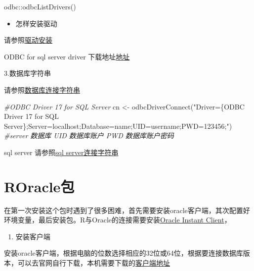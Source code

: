 \documentclass[
]{book}
\newenvironment{Shaded}{\begin{snugshade}}{\end{snugshade}}
\newcommand{\CommentTok}[1]{\textcolor[rgb]{0.56,0.35,0.01}{\textit{#1}}}
\newcommand{\FunctionTok}[1]{\textcolor[rgb]{0.00,0.00,0.00}{#1}}
\newcommand{\NormalTok}[1]{#1}
\newcommand{\OtherTok}[1]{\textcolor[rgb]{0.56,0.35,0.01}{#1}}
\newcommand{\SpecialCharTok}[1]{\textcolor[rgb]{0.00,0.00,0.00}{#1}}
\newcommand{\StringTok}[1]{\textcolor[rgb]{0.31,0.60,0.02}{#1}}
\providecommand{\tightlist}{%
  \setlength{\itemsep}{0pt}\setlength{\parskip}{0pt}}
\begin{document}
\begin{Shaded}
\begin{Highlighting}[]
\NormalTok{odbc}\SpecialCharTok{::}\FunctionTok{odbcListDrivers}\NormalTok{()}
\end{Highlighting}
\end{Shaded}

\begin{itemize}
\tightlist
\item
  怎样安装驱动
\end{itemize}

请参照\href{https://github.com/r-dbi/odbc\#installation}{驱动安装}

ODBC for sql server driver 下载地址\href{https://docs.microsoft.com/zh-cn/sql/connect/odbc/download-odbc-driver-for-sql-server?view=sql-server-ver15}{地址}

3.数据库字符串

请参照\href{https://www.connectionstrings.com/}{数据库连接字符串}

\begin{Shaded}
\begin{Highlighting}[]
\CommentTok{\#ODBC Driver 17 for SQL Server}
\NormalTok{cn }\OtherTok{\textless{}{-}} \FunctionTok{odbcDriverConnect}\NormalTok{(}\StringTok{"Driver=\{ODBC Driver 17 for SQL Server\};Server=localhost;Database=name;UID=username;PWD=123456;"}\NormalTok{) }\CommentTok{\#server 数据库 UID 数据库账户 PWD 数据库账户密码}
\end{Highlighting}
\end{Shaded}

sql server 请参照\href{https://www.connectionstrings.com/microsoft-odbc-driver-17-for-sql-server/}{sql server连接字符串}

\hypertarget{roracleux5305}{%
\section{ROracle包}\label{roracleux5305}}

在第一次安装这个包时遇到了很多困难，首先需要安装oracle客户端，其次配置好环境变量，最后安装包。R与Oracle的连接需要安装\href{https://www.oracle.com/database/technologies/instant-client.html}{Oracle Instant Client}，

\begin{enumerate}
\def\labelenumi{\arabic{enumi}.}
\tightlist
\item
  安装客户端
\end{enumerate}

安装oracle客户端，根据电脑的位数选择相应的32位或64位，根据要连接数据库版本，可以去官网自行下载，本机需要下载的\href{https://www.oracle.com/technetwork/database/enterprise-edition/downloads/112010-win64soft-094461.html}{客户端地址}
\end{document}
